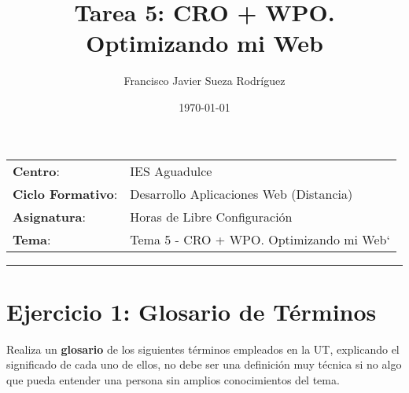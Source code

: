 


\title{
\vspace{10ex}
\normalfont \normalsize
\huge \textbf{Tarea 5: CRO + WPO. Optimizando mi Web}
}
\author{Francisco Javier Sueza Rodríguez}
\date{\normalsize\today}



\maketitle

\thispagestyle{empty}

\vspace{75ex}

\begin{center}
    \begin{tabular}{l l}
        \textbf{Centro}: & IES Aguadulce \\
        \textbf{Ciclo Formativo}: & Desarrollo Aplicaciones Web (Distancia)\\
        \textbf{Asignatura}: & Horas de Libre Configuración\\
        \textbf{Tema}: & Tema 5 - CRO + WPO. Optimizando mi Web`\\
    \end{tabular}
\end{center}

\newpage

\tableofcontents

\vspace{15ex}

\hrule

\vspace{10ex}

\listoffigures

\newpage

\section{Ejercicio 1: Glosario de Términos}
Realiza un \textbf{glosario} de los siguientes términos empleados en la UT, explicando el significado de cada uno de ellos, no debe ser una definición muy técnica si no algo que pueda entender una persona sin amplios conocimientos del tema.

